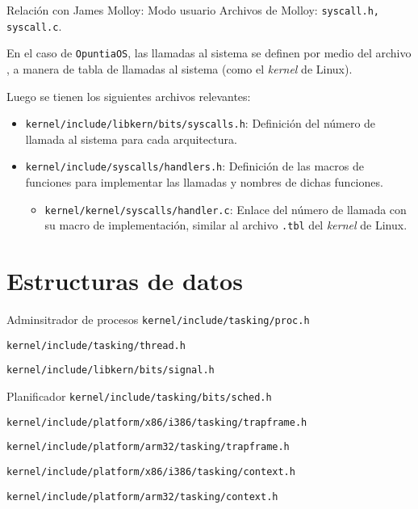 \begin{frame}{Relación con James Molloy: Modo usuario}
	Archivos de Molloy: \texttt{syscall.h, syscall.c}.
	
	En el caso de \texttt{OpuntiaOS}, las llamadas al sistema se definen por medio del archivo \texttt{}, a manera de tabla de llamadas al sistema (como el \textit{kernel} de Linux).
	
	Luego se tienen los siguientes archivos relevantes:
	\begin{itemize} \setlength\itemsep{0pt} \footnotesize
		\item \texttt{kernel/include/libkern/bits/syscalls.h}: Definición del número de llamada al sistema para cada arquitectura.
		
		\item \texttt{kernel/include/syscalls/handlers.h}: Definición de las macros de funciones para implementar las llamadas y nombres de dichas funciones.
		
		\begin{itemize} \setlength\itemsep{0pt}
			\item \texttt{kernel/kernel/syscalls/handler.c}: Enlace del número de llamada con su macro de implementación, similar al archivo \texttt{.tbl} del \textit{kernel} de Linux.
		\end{itemize}
	\end{itemize}
\end{frame}




\section{Estructuras de datos}
\begin{frame}{Adminsitrador de procesos}
	\texttt{kernel/include/tasking/proc.h}
	
	\texttt{kernel/include/tasking/thread.h}
	
	\texttt{kernel/include/libkern/bits/signal.h}
\end{frame}


\begin{frame}{Planificador}
	\texttt{kernel/include/tasking/bits/sched.h}
	
	\texttt{kernel/include/platform/x86/i386/tasking/trapframe.h}
	
	\texttt{kernel/include/platform/arm32/tasking/trapframe.h}
	
	\texttt{kernel/include/platform/x86/i386/tasking/context.h}
	
	\texttt{kernel/include/platform/arm32/tasking/context.h}
\end{frame}


